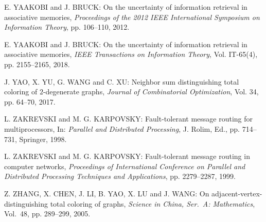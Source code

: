 \begin{thebibliography}{999}
E. YAAKOBI and J. BRUCK: On the uncertainty of information retrieval in associative memories, {\it Proceedings of the 2012 IEEE International Symposium on Information Theory}, pp. 106--110, 2012.

E. YAAKOBI and J. BRUCK: On the uncertainty of information retrieval in associative memories, {\it IEEE Transactions on Information Theory}, Vol. IT-65(4), pp. 2155--2165, 2018.

J. YAO, X. YU, G. WANG and C. XU: Neighbor sum distinguishing total coloring of $2$-degenerate graphs, {\it Journal of Combinatorial Optimization}, Vol. 34, pp. 64--70, 2017.  

L. ZAKREVSKI and M. G. KARPOVSKY: Fault-tolerant message routing for multiprocessors, In: {\it Parallel and Distributed Processing}, J. Rolim, Ed., pp. 714--731, Springer, 1998.

L. ZAKREVSKI and M. G. KARPOVSKY: Fault-tolerant message routing in computer networks, {\it Proceedings of International Conference on Parallel and Distributed Processing Techniques and Applications}, pp. 2279--2287, 1999.

Z. ZHANG, X. CHEN, J. LI, B. YAO, X. LU and J. WANG: On adjacent-vertex-distinguishing total coloring of graphs, {\it Science in China, Ser.~A: Mathematics}, Vol.~48, pp. 289--299, 2005.
\end{thebibliography}

